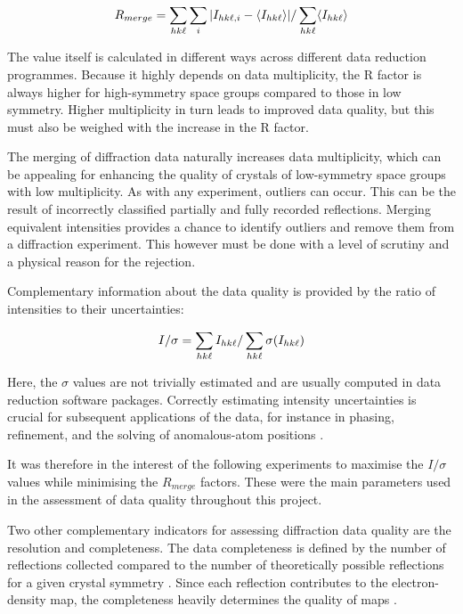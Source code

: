 \begin{equation}
    R_{merge} = \sum_{hk\ell}\sum_i | I_{hk\ell,i} - \langle I_{hk\ell} \rangle | / \sum_{hk\ell} \langle I_{hk\ell} \rangle
\end{equation}

The value itself is calculated in different ways across different data reduction programmes. Because it highly depends on data multiplicity, the R factor is always higher for high-symmetry space groups compared to those in low symmetry. Higher multiplicity in turn leads to improved data quality, but this must also be weighed with the increase in the R factor.

The merging of diffraction data naturally increases data multiplicity, which can be appealing for enhancing the quality of crystals of low-symmetry space groups with low multiplicity. As with any experiment, outliers can occur. This can be the result of incorrectly classified partially and fully recorded reflections. Merging equivalent intensities provides a chance to identify outliers and remove them from a diffraction experiment. This however must be done with a level of scrutiny and a physical reason for the rejection.

Complementary information about the data quality is provided by the ratio of intensities to their uncertainties:

\begin{equation}
    I / \sigma = \sum_{hk\ell} I_{hk\ell}/\sum_{hk\ell} \sigma(I_{hk\ell})
\end{equation}

Here, the $\sigma$ values are not trivially estimated and are usually computed in data reduction software packages. Correctly estimating intensity uncertainties is crucial for subsequent applications of the data, for instance in phasing, refinement, and the solving of anomalous-atom positions \cite{Dauter1999}.  

It was therefore in the interest of the following experiments to maximise the $I / \sigma$ values while minimising the $R_{merge}$ factors. These were the main parameters used in the assessment of data quality throughout this project.

Two other complementary indicators for assessing diffraction data quality are the resolution and completeness. The data completeness is defined by the number of reflections collected compared to the number of theoretically possible reflections for a given crystal symmetry \cite{Arkhipova2017}. %
Since each reflection contributes to the electron-density map, the completeness heavily determines the quality of maps \cite{Wlodawer2007}.


